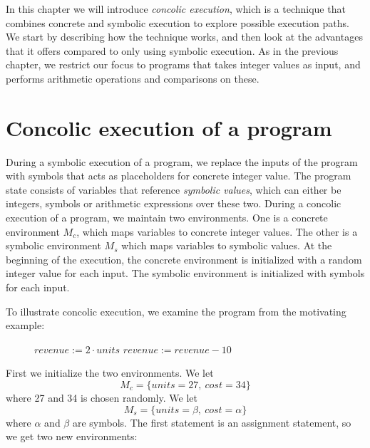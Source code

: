 In this chapter we will introduce \emph{concolic execution}, which is a technique that combines concrete and symbolic execution to explore possible execution paths. We start by describing how the technique works, and then look at the advantages that it offers compared to only using symbolic execution. As in the previous chapter, we restrict our focus to programs that takes integer values as input, and performs arithmetic operations and comparisons on these. 

\section{Concolic execution of a program}
	During a symbolic execution of a program, we replace the inputs of the program with symbols that acts as placeholders for concrete integer value. The program state consists of variables that reference \emph{symbolic values}, which can either be integers, symbols or arithmetic expressions over these two. During a concolic execution of a program, we maintain two environments. One is a concrete environment $M_c$, which maps variables to concrete integer values. The other is a symbolic environment $M_s$ which maps variables to symbolic values. At the beginning of the execution, the concrete environment is initialized with a random integer value for each input. The symbolic environment is initialized with symbols for each input. 


To illustrate concolic execution, we examine the program from the motivating example:


\begin{figure}[!h]
	\begin{algorithmic}[1]
		\State $revenue := 2\cdot units$
		\State $revenue := revenue - 10$
		\EndIf
		\State {}
		\EndProcedure
	\end{algorithmic}
\end{figure}

\motexample

\newpage

\noindent First we initialize the two environments. We let 
\begin{equation*}
	M_c = \{units = 27, \ cost = 34\}
\end{equation*}
 where 27 and 34 is chosen randomly. We let
\begin{equation*}
 	M_s = \{units =\beta, \ cost = \alpha\}
\end{equation*}
where $\alpha$ and $\beta$ are symbols. The first statement is an assignment statement, so we get two new environments:

